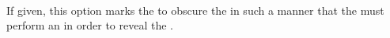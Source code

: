 \\

If given, this option marks the  to obscure the  in such a manner that the  must perform an  in order to reveal the .\\

\begin{examples}
\end{examples}

